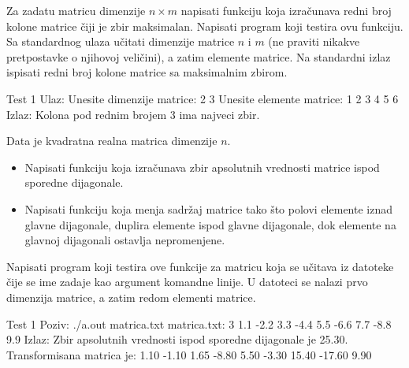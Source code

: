 \begin{Exercise}[label=336]
Za zadatu matricu dimenzije $n \times m$ napisati funkciju koja
izračunava redni broj kolone matrice čiji je zbir
maksimalan. Napisati program koji testira ovu funkciju. Sa
standardnog ulaza učitati dimenzije matrice $n$ i
$m$ (ne praviti nikakve pretpostavke o njihovoj veličini), 
a zatim elemente matrice. Na standardni izlaz ispisati 
redni broj kolone matrice sa maksimalnim zbirom.

\begin{maxitest}
\begin{test}{Test 1}
Ulaz:  Unesite dimenzije matrice:
       2 3
       Unesite elemente matrice:
       1 2 3
       4 5 6
Izlaz: Kolona pod rednim brojem 3 ima najveci zbir.		   
\end{test}
\end{maxitest}
\end{Exercise}
\begin{Answer}[ref=336]
\end{Answer}

\begin{Exercise}[label=337]
Data je kvadratna realna matrica dimenzije $n$.
\begin{itemize}
\item Napisati funkciju koja izračunava zbir apsolutnih 
vrednosti matrice ispod sporedne dijagonale. 
\item Napisati funkciju koja menja sadržaj matrice tako 
što polovi elemente iznad glavne dijagonale, duplira 
elemente ispod glavne dijagonale, dok elemente na 
glavnoj dijagonali ostavlja nepromenjene.
\end{itemize}
Napisati program koji testira ove funkcije za matricu koja se
učitava iz datoteke čije se ime zadaje kao argument komandne linije. 
U datoteci se nalazi prvo dimenzija matrice, a zatim redom elementi matrice.

\begin{maxitest}
\begin{test}{Test 1}
Poziv: ./a.out matrica.txt
matrica.txt:  3
              1.1 -2.2 3.3
              -4.4 5.5 -6.6
              7.7 -8.8 9.9
Izlaz: Zbir apsolutnih vrednosti ispod sporedne dijagonale je 25.30.
       Transformisana matrica je:
       1.10 -1.10 1.65 
       -8.80 5.50 -3.30 
       15.40 -17.60 9.90 	   
\end{test}
\end{maxitest}
\end{Exercise}
\begin{Answer}[ref=337]
\end{Answer}

